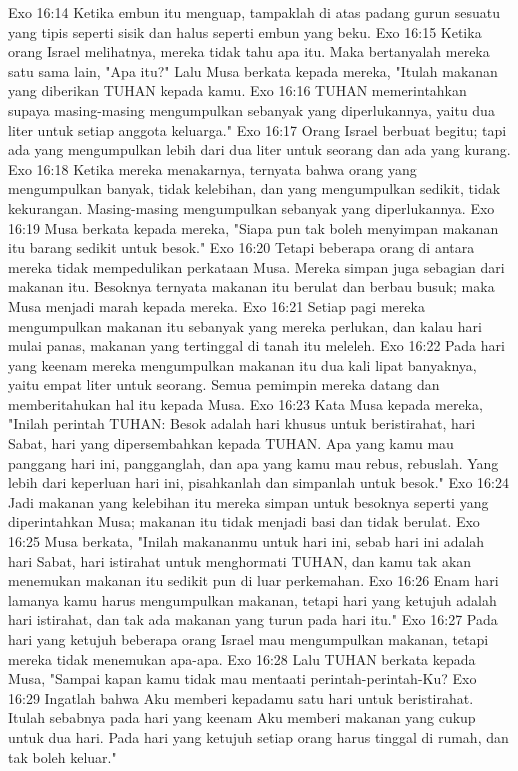 Exo 16:14  Ketika embun itu menguap, tampaklah di atas padang gurun sesuatu yang tipis seperti sisik dan halus seperti embun yang beku.
Exo 16:15  Ketika orang Israel melihatnya, mereka tidak tahu apa itu. Maka bertanyalah mereka satu sama lain, "Apa itu?" Lalu Musa berkata kepada mereka, "Itulah makanan yang diberikan TUHAN kepada kamu.
Exo 16:16  TUHAN memerintahkan supaya masing-masing mengumpulkan sebanyak yang diperlukannya, yaitu dua liter untuk setiap anggota keluarga."
Exo 16:17  Orang Israel berbuat begitu; tapi ada yang mengumpulkan lebih dari dua liter untuk seorang dan ada yang kurang.
Exo 16:18  Ketika mereka menakarnya, ternyata bahwa orang yang mengumpulkan banyak, tidak kelebihan, dan yang mengumpulkan sedikit, tidak kekurangan. Masing-masing mengumpulkan sebanyak yang diperlukannya.
Exo 16:19  Musa berkata kepada mereka, "Siapa pun tak boleh menyimpan makanan itu barang sedikit untuk besok."
Exo 16:20  Tetapi beberapa orang di antara mereka tidak mempedulikan perkataan Musa. Mereka simpan juga sebagian dari makanan itu. Besoknya ternyata makanan itu berulat dan berbau busuk; maka Musa menjadi marah kepada mereka.
Exo 16:21  Setiap pagi mereka mengumpulkan makanan itu sebanyak yang mereka perlukan, dan kalau hari mulai panas, makanan yang tertinggal di tanah itu meleleh.
Exo 16:22  Pada hari yang keenam mereka mengumpulkan makanan itu dua kali lipat banyaknya, yaitu empat liter untuk seorang. Semua pemimpin mereka datang dan memberitahukan hal itu kepada Musa.
Exo 16:23  Kata Musa kepada mereka, "Inilah perintah TUHAN: Besok adalah hari khusus untuk beristirahat, hari Sabat, hari yang dipersembahkan kepada TUHAN. Apa yang kamu mau panggang hari ini, pangganglah, dan apa yang kamu mau rebus, rebuslah. Yang lebih dari keperluan hari ini, pisahkanlah dan simpanlah untuk besok."
Exo 16:24  Jadi makanan yang kelebihan itu mereka simpan untuk besoknya seperti yang diperintahkan Musa; makanan itu tidak menjadi basi dan tidak berulat.
Exo 16:25  Musa berkata, "Inilah makananmu untuk hari ini, sebab hari ini adalah hari Sabat, hari istirahat untuk menghormati TUHAN, dan kamu tak akan menemukan makanan itu sedikit pun di luar perkemahan.
Exo 16:26  Enam hari lamanya kamu harus mengumpulkan makanan, tetapi hari yang ketujuh adalah hari istirahat, dan tak ada makanan yang turun pada hari itu."
Exo 16:27  Pada hari yang ketujuh beberapa orang Israel mau mengumpulkan makanan, tetapi mereka tidak menemukan apa-apa.
Exo 16:28  Lalu TUHAN berkata kepada Musa, "Sampai kapan kamu tidak mau mentaati perintah-perintah-Ku?
Exo 16:29  Ingatlah bahwa Aku memberi kepadamu satu hari untuk beristirahat. Itulah sebabnya pada hari yang keenam Aku memberi makanan yang cukup untuk dua hari. Pada hari yang ketujuh setiap orang harus tinggal di rumah, dan tak boleh keluar."
